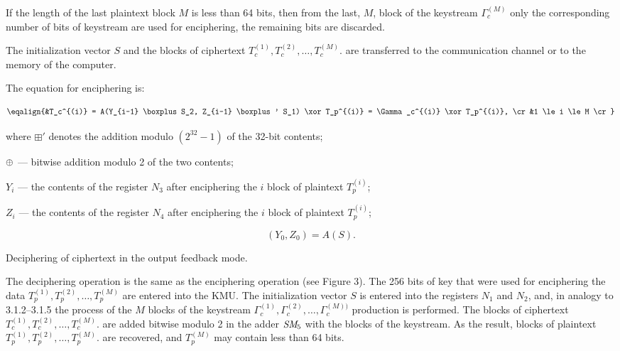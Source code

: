      If the length of the last plaintext block $M$ is less than 64
bits, then from the last, $M${\th}, block of the keystream
$\Gamma_c^{(M)}$ only the corresponding number of bits of keystream are
used for enciphering, the remaining bits are discarded. \par

The initialization vector $S$ and the blocks of ciphertext
$T_c^{(1)}, T_c^{(2)}, \ldots, T_{c}^{(M)}$.
are transferred to the communication channel or to the memory of the 
computer. \par

The equation for enciphering is:

$$ \eqalign{&T_c^{(i)} = A(Y_{i-1} \boxplus S_2, Z_{i-1} \boxplus' S_1) \xor T_p^{(i)} = \Gamma_c^{(i)} \xor T_p^{(i)}, \cr
	    &1 \le i \le M \cr} $$

where $\boxplus'$ denotes the addition modulo $(2^{32}-1)$ of the 32-bit
contents; \par

%

      $\oplus$ --- bitwise addition modulo 2 of the two contents; \par

      $Y_i$ --- the contents of the register $N_3$ after enciphering the
$i${\th} block of plaintext $T_p^{(i)}$; \par

       $Z_i$ --- the contents of the register $N_4$ after enciphering the
$i${\th} block of plaintext $T_p^{(i)}$; \par

	$$ (Y_0, Z_0) = A(S). $$

Deciphering of ciphertext in the output feedback mode.

The deciphering operation is the same as the
enciphering operation (see Figure 3).  The 256 bits of key that were used for enciphering 
the data $T_p^{(1)}, T_p^{(2)}, \ldots, T_p^{(M)}$
are entered into the KMU. The initialization vector $S$ is entered into the 
registers $N_1$ and $N_2$, and, in analogy to 3.1.2--3.1.5 the 
process of the $M$ blocks of the keystream
$\Gamma_c^{(1)}, \Gamma_c^{(2)}, \ldots, \Gamma_c^{(M))}$
production is performed.  The blocks of ciphertext 
$T_c^{(1)}, T_c^{(2)}, \ldots, T_c^{(M)}.$
are added bitwise modulo 2 in the adder
${\it SM\!}_5$ with the blocks of the keystream.  As the result, blocks of plaintext
$T_p^{(1)}, T_p^{(2)}, \ldots, T_p^{(M)}.$
are recovered, and $T_p^{(M)}$ may contain less than 64 bits.

